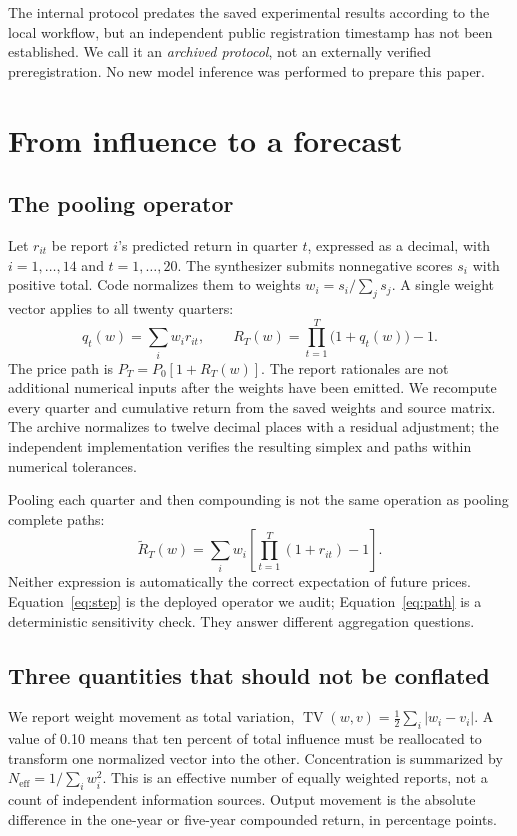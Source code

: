 \documentclass[11pt]{article}
\newcommand{\TV}{\operatorname{TV}}
\newcommand{\Neff}{N_{\mathrm{eff}}}
\begin{document}
The internal protocol predates the saved experimental results according to the local workflow, but an independent public registration timestamp has not been established. We call it an \emph{archived protocol}, not an externally verified preregistration. No new model inference was performed to prepare this paper.

\section{From influence to a forecast}
\subsection{The pooling operator}
Let $r_{it}$ be report $i$'s predicted return in quarter $t$, expressed as a decimal, with $i=1,\ldots,14$ and $t=1,\ldots,20$. The synthesizer submits nonnegative scores $s_i$ with positive total. Code normalizes them to weights $w_i=s_i/\sum_j s_j$. A single weight vector applies to all twenty quarters:
\begin{equation}
q_t(w)=\sum_i w_i r_{it},\qquad
R_T(w)=\prod_{t=1}^{T}\bigl(1+q_t(w)\bigr)-1.
\label{eq:step}
\end{equation}
The price path is $P_T=P_0[1+R_T(w)]$. The report rationales are not additional numerical inputs after the weights have been emitted. We recompute every quarter and cumulative return from the saved weights and source matrix. The archive normalizes to twelve decimal places with a residual adjustment; the independent implementation verifies the resulting simplex and paths within numerical tolerances.

Pooling each quarter and then compounding is not the same operation as pooling complete paths:
\begin{equation}
\widetilde R_T(w)=\sum_i w_i\left[\prod_{t=1}^{T}(1+r_{it})-1\right].
\label{eq:path}
\end{equation}
Neither expression is automatically the correct expectation of future prices. Equation~\ref{eq:step} is the deployed operator we audit; Equation~\ref{eq:path} is a deterministic sensitivity check. They answer different aggregation questions.

\subsection{Three quantities that should not be conflated}
We report weight movement as total variation, $\TV(w,v)=\frac12\sum_i|w_i-v_i|$. A value of 0.10 means that ten percent of total influence must be reallocated to transform one normalized vector into the other. Concentration is summarized by $\Neff=1/\sum_iw_i^2$. This is an effective number of equally weighted reports, not a count of independent information sources. Output movement is the absolute difference in the one-year or five-year compounded return, in percentage points.
\end{document}
